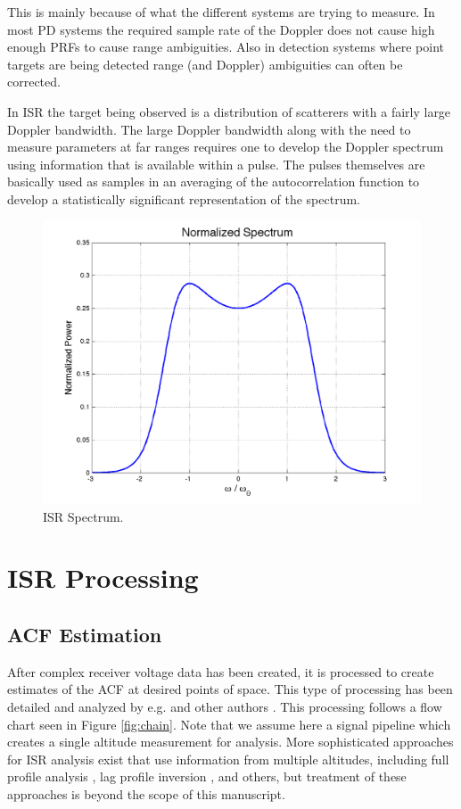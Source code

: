 This is mainly because of what the different systems are trying to measure.  In most PD systems the required sample rate of the Doppler does not cause high enough PRFs to cause range ambiguities.  Also in detection systems where point targets are being detected range (and Doppler) ambiguities can often be corrected.

In ISR the target being observed is a distribution of scatterers with a fairly large Doppler bandwidth.  The large Doppler bandwidth along with the need to measure parameters at far ranges requires one to develop the Doppler spectrum using information that is available within a pulse.  The pulses themselves are basically used as samples in an averaging of the autocorrelation function to develop a statistically significant representation of the spectrum.

\begin{figure}[!t]
\centering
\includegraphics[width=6in]{ionlinespec}
\caption{ISR Spectrum.}
\label{fig:ispecch2}
\end{figure}

\section{ISR Processing}

\subsection{ACF Estimation}
After complex receiver voltage data has been created, it is processed to create estimates of the ACF at desired points of space. This type of processing has been detailed and analyzed by e.g. \cite{farley1969} and other authors \cite{nygren1996}. This processing follows a flow chart seen in Figure \ref{fig:chain}.  Note that we assume here a signal pipeline which creates a single altitude measurement for analysis.  More sophisticated approaches for ISR analysis exist that use information from multiple altitudes, including full profile analysis \cite{RDS:RDS3308}, lag profile inversion \cite{Virtanen:20082vx}, and others, but treatment of these approaches is beyond the scope of this manuscript.

